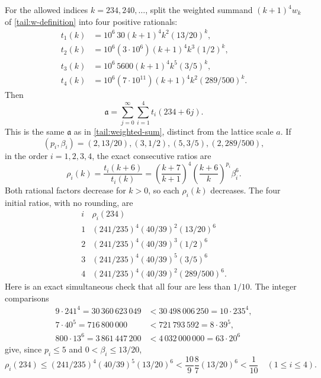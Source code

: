 For the allowed indices $k=234,240,\ldots$, split the weighted summand
$(k+1)^4w_k$ of \eqref{tail:w-definition} into four positive rationals:
\begin{align*}
 t_1(k)&=10^6\,30(k+1)^4k^2(13/20)^k,\\
 t_2(k)&=10^6(3\cdot10^6)(k+1)^4k^3(1/2)^k,\\
 t_3(k)&=10^6\,5600(k+1)^4k^5(3/5)^k,\\
 t_4(k)&=10^6(7\cdot10^{11})(k+1)^4k^2(289/500)^k.
\end{align*}
Then
\[
 \mathfrak a=\sum_{j=0}^{\infty}\sum_{i=1}^4t_i(234+6j).
\]
This is the same $\mathfrak a$ as in \eqref{tail:weighted-sum}, distinct
from the lattice scale $a$.  If
\[
 (p_i,\beta_i)=(2,13/20),(3,1/2),(5,3/5),(2,289/500),
\]
in the order $i=1,2,3,4$, the exact consecutive ratios are
\begin{equation}
 \rho_i(k)=\frac{t_i(k+6)}{t_i(k)}
 =\left(\frac{k+7}{k+1}\right)^4
  \left(\frac{k+6}{k}\right)^{p_i}\beta_i^6.
 \label{supp:component-ratios}
\end{equation}
Both rational factors decrease for $k>0$, so each $\rho_i(k)$ decreases.
The four initial ratios, with no rounding, are
\[
 \begin{array}{c|c}
 i&\rho_i(234)\\ \hline
 1&(241/235)^4(40/39)^2(13/20)^6\\
 2&(241/235)^4(40/39)^3(1/2)^6\\
 3&(241/235)^4(40/39)^5(3/5)^6\\
 4&(241/235)^4(40/39)^2(289/500)^6.
 \end{array}
\]
Here is an exact simultaneous check that all four are less than $1/10$.
The integer comparisons
\begin{align*}
 9\cdot241^4=30\,360\,623\,049
   &<30\,498\,006\,250=10\cdot235^4,\\
 7\cdot40^5=716\,800\,000
   &<721\,793\,592=8\cdot39^5,\\
 800\cdot13^6=3\,861\,447\,200
   &<4\,032\,000\,000=63\cdot20^6
\end{align*}
give, since $p_i\leq5$ and $0<\beta_i\leq13/20$,
\begin{equation}
 \rho_i(234)
 \leq(241/235)^4(40/39)^5(13/20)^6
 <\frac{10}{9}\frac87(13/20)^6<\frac1{10}
 \quad(1\leq i\leq4).
 \label{supp:initial-ratio-bound}
\end{equation}

